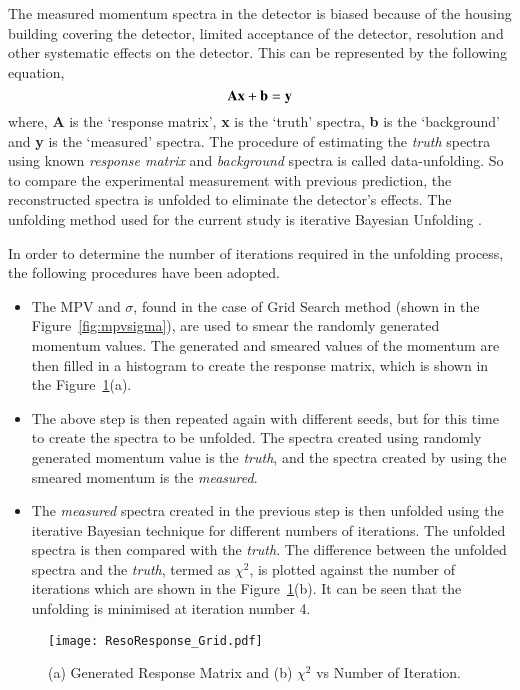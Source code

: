 The measured momentum spectra in the detector is biased
because of the housing building covering the detector, limited
acceptance of the detector, resolution and other systematic effects
on the detector. This can be represented by the following equation,
\begin{equation}
  {\bf A}{\bf x}+{\bf b}={\bf y}
  \label{eq:unfold}
\end{equation}
where, {\bf A} is the `response matrix', {\bf x} is the `truth' spectra,
{\bf b} is the `background' and {\bf y} is the `measured' spectra.
The procedure of estimating the {\it truth} spectra using known
{\it response matrix} and {\it background} spectra is called
data-unfolding. So to compare the experimental measurement with
previous prediction, the reconstructed spectra is unfolded to eliminate
the detector's effects.
The unfolding method used for the current
study is iterative Bayesian Unfolding \cite{bayesian}.

In order to determine the number of iterations required in the
unfolding process, the following procedures have been adopted.
\begin{itemize} %
\item The MPV and $\sigma$, found in the case of Grid Search method
  (shown in the Figure~\ref{fig:mpvsigma}), are used to smear
  the randomly generated momentum values. The generated and smeared
  values of the momentum are then filled in a histogram to create
  the response matrix, which is shown in the
  Figure~\ref{fig:unfolditer}(a).
\item The above step is then repeated again with different seeds,
  but for this time to create the spectra to be unfolded. The spectra
  created using randomly generated momentum value is the {\it truth},
  and the spectra created by using the smeared momentum is the
  {\it measured}.
\item The {\it measured} spectra created in the previous step is then
  unfolded using the iterative Bayesian technique for different numbers
  of iterations. The unfolded spectra is then compared with the
  {\it truth}. The difference between the unfolded spectra and the
  {\it truth}, termed as $\chi^{2}$, is plotted against the number of
  iterations which are shown in the Figure~\ref{fig:unfolditer}(b).
  It can be seen that the unfolding is minimised at iteration number 4.
\end{itemize}
\begin{figure}[h]
  \centering
  \texttt{[image: ResoResponse\_Grid.pdf]}
  \caption{(a) Generated Response Matrix and
    (b) $\chi^{2}$ vs Number of Iteration.}
  \label{fig:unfolditer}
\end{figure}

